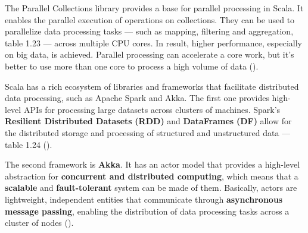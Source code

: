 The Parallel Collections library provides a base for parallel processing in Scala. It enables the parallel execution of operations on collections. They can be used to parallelize data processing tasks — such as mapping, filtering and aggregation, table 1.23 — across multiple CPU cores. In result, higher performance, especially on big data, is achieved. Parallel processing can accelerate a core work, but it's better to use more than one core to process a high volume of data (\cite{tomeDataEngineeringScala2024})\footnotemark[10].



Scala has a rich ecosystem of libraries and frameworks that facilitate distributed data processing, such as Apache Spark and Akka. The first one provides high-level APIs for processing large datasets across clusters of machines. Spark's \textbf{Resilient Distributed Datasets}  \textbf{(RDD)} and \textbf{DataFrames} \textbf{(DF)} allow for the distributed storage and processing of structured and unstructured data — table 1.24 (\cite{tomeDataEngineeringScala2024})\footnotemark[10].



The second framework is \textbf{Akka}. It has an actor model that provides a high-level abstraction for \textbf{concurrent and distributed computing}, which means that a \textbf{scalable} and \textbf{fault-tolerant} system can be made of them. Basically, actors are lightweight, independent entities that communicate through \textbf{asynchronous message passing}, enabling the distribution of data processing tasks across a cluster of nodes (\cite{tomeDataEngineeringScala2024})\footnotemark[10].

